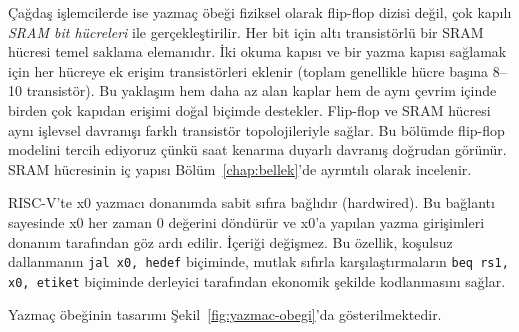 Çağdaş işlemcilerde ise yazmaç öbeği fiziksel olarak flip-flop dizisi değil, çok kapılı \emph{SRAM bit hücreleri} ile gerçekleştirilir. Her bit için altı transistörlü bir SRAM hücresi temel saklama elemanıdır. İki okuma kapısı ve bir yazma kapısı sağlamak için her hücreye ek erişim transistörleri eklenir (toplam genellikle hücre başına 8--10 transistör). Bu yaklaşım hem daha az alan kaplar hem de aynı çevrim içinde birden çok kapıdan erişimi doğal biçimde destekler. Flip-flop ve SRAM hücresi aynı işlevsel davranışı farklı transistör topolojileriyle sağlar. Bu bölümde flip-flop modelini tercih ediyoruz çünkü saat kenarına duyarlı davranış doğrudan görünür. SRAM hücresinin iç yapısı Bölüm~\ref{chap:bellek}'de ayrıntılı olarak incelenir.

\begin{bilginot}
RISC-V'te x0 yazmacı donanımda sabit sıfıra bağlıdır (hardwired). Bu bağlantı sayesinde x0 her zaman 0 değerini döndürür ve x0'a yapılan yazma girişimleri donanım tarafından göz ardı edilir. İçeriği değişmez. Bu özellik, koşulsuz dallanmanın \texttt{jal x0, hedef} biçiminde, mutlak sıfırla karşılaştırmaların \texttt{beq rs1, x0, etiket} biçiminde derleyici tarafından ekonomik şekilde kodlanmasını sağlar.
\end{bilginot}

Yazmaç öbeğinin tasarımı Şekil~\ref{fig:yazmac-obegi}'da gösterilmektedir.

